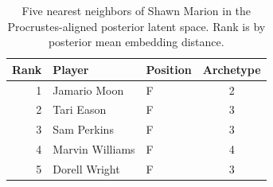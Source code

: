 \begin{table}[htbp]
  \centering\small
  \begin{tabular}{rllc}
    \toprule
    Rank & Player & Position & Archetype \\
    \midrule
    1 & Jamario Moon & F & 2 \\
    2 & Tari Eason & F & 3 \\
    3 & Sam Perkins & F & 3 \\
    4 & Marvin Williams & F & 4 \\
    5 & Dorell Wright & F & 3 \\
    \bottomrule
  \end{tabular}
  \caption{Five nearest neighbors of Shawn Marion in the Procrustes-aligned posterior latent space. Rank is by posterior mean embedding distance.}
  \label{tab:Shawn_Marion_neighbors}
\end{table}

